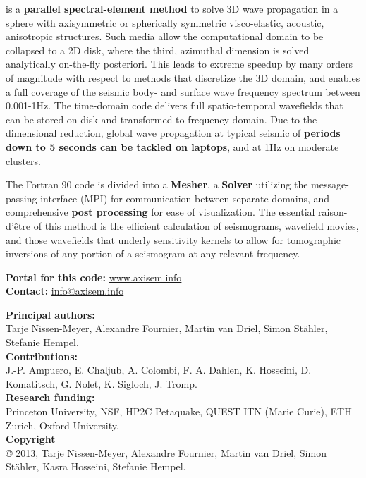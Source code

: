 \documentclass{article}
\begin{document}
%
%
 is a \textbf{parallel spectral-element method} to solve
3D wave propagation in a sphere with axisymmetric or spherically symmetric
visco-elastic, acoustic, anisotropic structures. Such media allow the
computational domain to be collapsed to a 2D disk, where the third, azimuthal
dimension is solved analytically on-the-fly posteriori. This leads to extreme
speedup by many orders of magnitude with respect to methods that discretize the
3D domain, and enables a full coverage of the seismic body- and surface wave
frequency spectrum between 0.001-1Hz.  The time-domain code delivers full
spatio-temporal wavefields that can be stored on disk and transformed to
frequency domain. Due to the dimensional reduction, global wave propagation at
typical seismic of \textbf{periods down to 5 seconds can be tackled on
laptops}, and at 1Hz on moderate clusters.

The Fortran 90 code is divided into a \textbf{Mesher}, a \textbf{Solver}
utilizing the message-passing interface (MPI) for communication between
separate domains, and comprehensive \textbf{post processing} for ease of
visualization.
The essential raison-d'\^{e}tre of this method is the efficient
calculation of seismograms, wavefield movies, and those wavefields that underly
sensitivity kernels to allow for tomographic inversions of any portion of a
seismogram at any relevant frequency. 

\begin{center}
\textbf{Portal for this code:} \href{http://www.axisem.info}{www.axisem.info}\\
\textbf{Contact:} \href{mailto:info@axisem.info}{info@axisem.info}
\end{center}

%
\noindent \textbf{Principal authors:} \\
Tarje Nissen-Meyer, Alexandre
Fournier, Martin van Driel, Simon St\"{a}hler, Stefanie Hempel.\vspace*{0.3cm}\\
\noindent \textbf{Contributions:}\\
 J.-P. Ampuero, E. Chaljub, A. Colombi, F. A. Dahlen, K. Hosseini, D. Komatitsch,
 G. Nolet, K. Sigloch, J. Tromp.\vspace*{0.3cm}\\
\noindent \textbf{Research funding:} \\Princeton University, NSF, HP2C Petaquake, 
QUEST ITN (Marie Curie), ETH Zurich, Oxford University.\vspace*{0.3cm}\\
%
\noindent \textbf{Copyright}\\
\copyright  \hspace*{0.1cm} 
2013, Tarje Nissen-Meyer,
Alexandre Fournier, Martin van Driel, Simon St\"{a}hler, Kasra
Hosseini, Stefanie Hempel.\vspace*{0.3cm}\\
\end{document}
